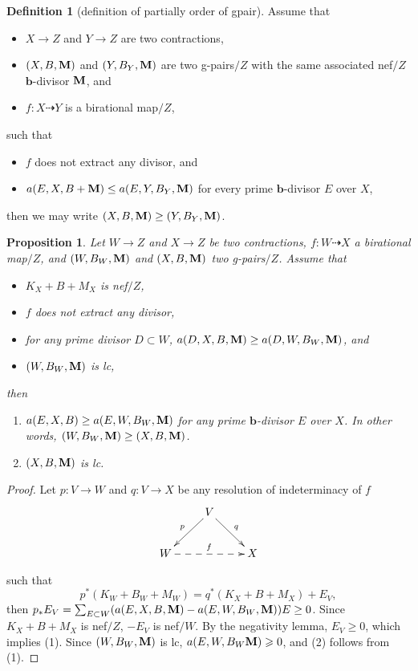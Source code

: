 \documentclass[11pt]{amsart}
\numberwithin{equation}{section}
\newcommand{\bb}{\bm{b}}
\newcommand{\Mm}{{\bf{M}}}
\newtheorem{prop}[thm]{Proposition}
\theoremstyle{definition}
\newtheorem{defn}[thm]{Definition}
\theoremstyle{definition}
\theoremstyle{definition}
\begin{document}
\begin{defn}[definition of  partially order of gpair]
Assume that
\begin{itemize}
    \item $X\rightarrow Z$ and $Y\rightarrow Z$ are two contractions,
    \item $(X,B,\Mm)$ and $(Y,B_Y,\Mm)$ are two g-pairs$/Z$ with the same associated nef$/Z$ $\bb$-divisor $\Mm$, and
    \item $f: X\dashrightarrow Y$ is a birational map$/Z$,
\end{itemize}
such that
\begin{itemize}
    \item $f$ does not extract any divisor, and
    \item $a(E,X,B+\Mm)\leq a(E,Y,B_Y,\Mm)$ for every prime $\bb$-divisor $E$ over $X$,
\end{itemize}
then we may write $(X,B,\Mm)\geq (Y,B_Y,\Mm)$.
\end{defn}

\begin{prop}\label{prop: g lc prop} 
Let $W\rightarrow Z$ and $X\rightarrow Z$ be two contractions, $f:W\dashrightarrow X$ a birational map$/Z$, and $(W,B_W,\Mm)$ and $(X,B,\Mm)$ two g-pairs$/Z$. Assume that
\begin{itemize}
    \item $K_X+B+M_X$ is nef$/Z$,
    \item $f$ does not extract any divisor,
    \item for any prime divisor $D\subset W$, $a(D,X,B,\Mm )\geq a(D,W,B_W,\Mm)$, and
    \item $(W,B_W,\Mm)$ is lc,
\end{itemize}
then
\begin{enumerate}
    \item $a(E,X,B)\geq a(E,W,B_{W},\Mm)$ for any prime $\bb$-divisor $E$ over $X$. In other words, $(W,B_{W},\Mm)\geq (X,B,\Mm)$.

    \item $(X,B,\Mm)$ is lc.
\end{enumerate}
\end{prop}

\begin{proof}
Let 
$p: V\rightarrow W$ and $q: V\rightarrow X$ be any resolution of indeterminacy of $f$ 
\[
  \xymatrix{
 & V\ar@{->}[dl]_{p}\ar@{->}[dr]^{q}& \\
      W\ar@{-->}[rr]^{f}   &  & X \\
    }
\]


such that
$$p^*(K_W+B_W+M_W)=q^*(K_X+B+M_X)+E_V,$$
then $p_*E_V=\sum_{E\subset W}(a(E,X,B,\Mm)-a(E,W,B_W,\Mm))E\geq 0$. Since $K_X+B+M_X$ is nef$/Z$, $-E_V$ is nef$/W$. By the negativity lemma, $E_V\geq 0$, which implies (1). 
Since $(W,B_W,\Mm)$ is lc, $a(E,W,B_W\Mm) \geqslant 0 $, and (2) follows from (1).  
\end{proof}
\end{document}
